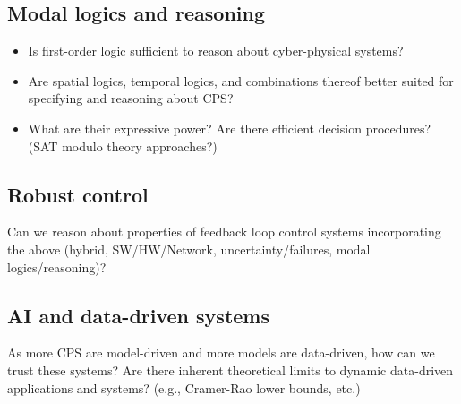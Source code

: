 \documentclass[
graybox,
envcountchap,
natbib
]{svmult}
\begin{document}
\begin{bibunit}
         \subsection{Modal logics and reasoning}
        
         \begin{itemize}
         \item  Is first-order logic sufficient to reason about cyber-physical systems?
         \item Are spatial logics, temporal logics, and combinations thereof better suited for specifying and reasoning about CPS?
         \item What are their expressive power?   Are there efficient decision procedures?  (SAT modulo theory approaches?)
         \end{itemize}

         \subsection{Robust control}

         Can we reason about properties of feedback loop control systems incorporating the above (hybrid, SW/HW/Network, uncertainty/failures, modal logics/reasoning)?
         
         \subsection{AI and data-driven systems}

         As more CPS are model-driven and more models are data-driven, how can we trust these systems?  Are there inherent theoretical limits to dynamic data-driven applications and systems? (e.g., Cramer-Rao lower bounds, etc.)

	
	
	
	

\end{bibunit}
\end{document}
